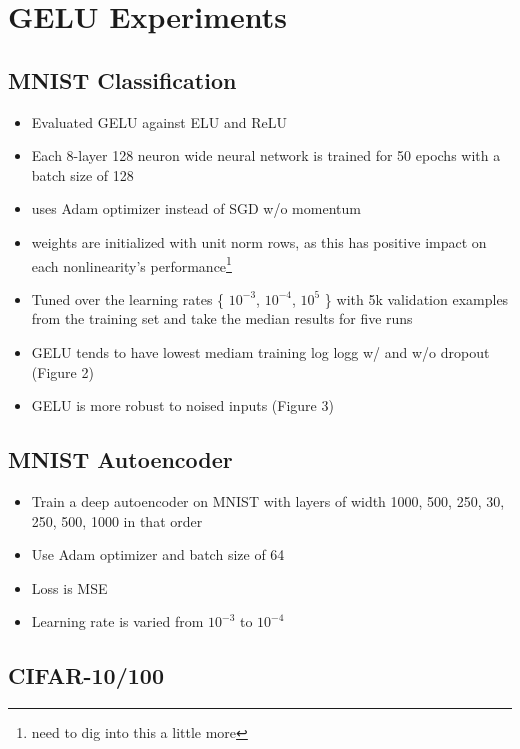 \section{GELU Experiments}

    \subsection{MNIST Classification}

        \begin{itemize}
            \item Evaluated GELU against ELU and ReLU
            \item Each 8-layer 128 neuron wide neural network is trained for 50 epochs with a batch size of 128
            \item uses Adam optimizer instead of SGD w/o momentum
            \item weights are initialized with unit norm rows, as this has positive impact on each nonlinearity's performance\footnote{need to dig into this a little more}
            \item Tuned over the learning rates \{ $10^{-3}$, $10^{-4}$, $10^{5}$ \} with 5k validation examples from the training set and take the median results for five runs
            \item GELU tends to have lowest mediam training log logg w/ and w/o dropout (Figure 2)
            \item GELU is more robust to noised inputs (Figure 3)
        \end{itemize}

    \subsection{MNIST Autoencoder}

        \begin{itemize}
            \item Train a deep autoencoder on MNIST with layers of width 1000, 500, 250, 30, 250, 500, 1000 in that order
            \item Use Adam optimizer and batch size of 64
            \item Loss is MSE
            \item Learning rate is varied from $10^{-3}$ to $10^{-4}$
        \end{itemize}

    \subsection{CIFAR-10/100}



